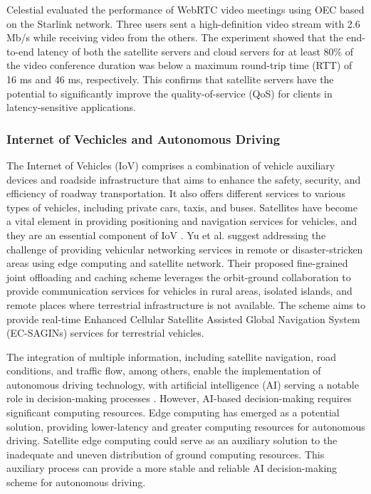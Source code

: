 \documentclass[lettersize,journal]{IEEEtran}
\begin{document}
Celestial \cite{RN102} evaluated the performance of WebRTC video meetings using OEC based on the Starlink network. Three users sent a high-definition video stream with 2.6 Mb/s while receiving video from the others. The experiment showed that the end-to-end latency of both the satellite servers and cloud servers for at least 80\% of the video conference duration was below a maximum round-trip time (RTT) of 16 ms and 46 ms, respectively. This confirms that satellite servers have the potential to significantly improve the quality-of-service (QoS) for clients in latency-sensitive applications.


\subsubsection*{Internet of Vechicles and Autonomous Driving}

The Internet of Vehicles (IoV) comprises a combination of vehicle auxiliary devices and roadside infrastructure that aims to enhance the safety, security, and efficiency of roadway transportation. It also offers different services to various types of vehicles, including private cars, taxis, and buses. Satellites have become a vital element in providing positioning and navigation services for vehicles, and they are an essential component of IoV \cite{RN234}. Yu et al. \cite{RN235} suggest addressing the challenge of providing vehicular networking services in remote or disaster-stricken areas using edge computing and satellite network. Their proposed fine-grained joint offloading and caching scheme leverages the orbit-ground collaboration to provide communication services for vehicles in rural areas, isolated islands, and remote places where terrestrial infrastructure is not available. The scheme aims to provide real-time Enhanced Cellular Satellite Assisted Global Navigation System (EC-SAGINs) services for terrestrial vehicles.

The integration of multiple information, including satellite navigation, road conditions, and traffic flow, among others, enable the implementation of autonomous driving technology, with artificial intelligence (AI) serving a notable role in decision-making processes \cite{RN81}. However, AI-based decision-making requires significant computing resources. Edge computing has emerged as a potential solution, providing lower-latency and greater computing resources for autonomous driving. Satellite edge computing could serve as an auxiliary solution to the inadequate and uneven distribution of ground computing resources. This auxiliary process can provide a more stable and reliable AI decision-making scheme for autonomous driving.
\end{document}
